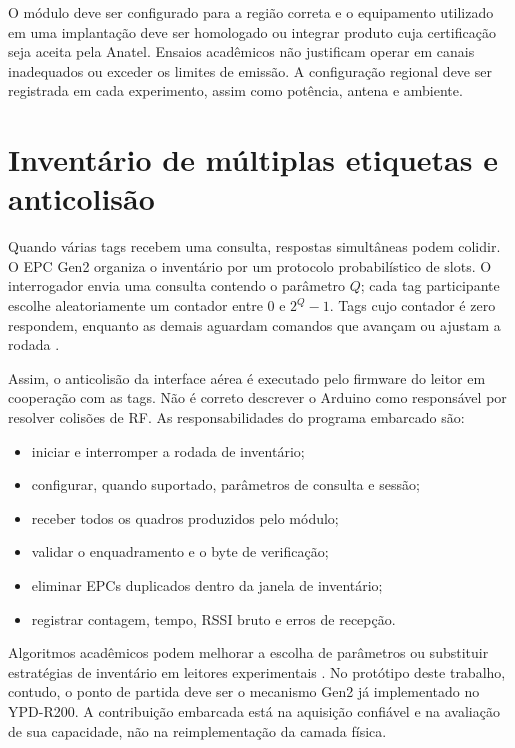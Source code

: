 O módulo deve ser configurado para a região correta e o equipamento utilizado em uma implantação deve ser homologado ou integrar produto cuja certificação seja aceita pela Anatel. Ensaios acadêmicos não justificam operar em canais inadequados ou exceder os limites de emissão. A configuração regional deve ser registrada em cada experimento, assim como potência, antena e ambiente.

\section{Inventário de múltiplas etiquetas e anticolisão}

Quando várias tags recebem uma consulta, respostas simultâneas podem colidir. O EPC Gen2 organiza o inventário por um protocolo probabilístico de slots. O interrogador envia uma consulta contendo o parâmetro $Q$; cada tag participante escolhe aleatoriamente um contador entre 0 e $2^Q-1$. Tags cujo contador é zero respondem, enquanto as demais aguardam comandos que avançam ou ajustam a rodada \cite{gs1gen2}.

Assim, o anticolisão da interface aérea é executado pelo firmware do leitor em cooperação com as tags. Não é correto descrever o Arduino como responsável por resolver colisões de RF. As responsabilidades do programa embarcado são:

\begin{itemize}
    \item iniciar e interromper a rodada de inventário;
    \item configurar, quando suportado, parâmetros de consulta e sessão;
    \item receber todos os quadros produzidos pelo módulo;
    \item validar o enquadramento e o byte de verificação;
    \item eliminar EPCs duplicados dentro da janela de inventário;
    \item registrar contagem, tempo, RSSI bruto e erros de recepção.
\end{itemize}

Algoritmos acadêmicos podem melhorar a escolha de parâmetros ou substituir estratégias de inventário em leitores experimentais \cite{su2019anticollision}. No protótipo deste trabalho, contudo, o ponto de partida deve ser o mecanismo Gen2 já implementado no YPD-R200. A contribuição embarcada está na aquisição confiável e na avaliação de sua capacidade, não na reimplementação da camada física.

